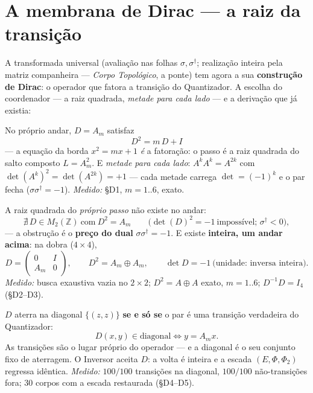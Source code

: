 \documentclass[livro.tex]{subfiles}
\begin{document}
\section{A membrana de Dirac --- a raiz da transição}\label{sec:dirac-operacoes}

A transformada universal (avaliação nas folhas $\sigma,\sigma^{\dagger}$;
realização inteira pela matriz companheira --- \emph{Corpo Topológico},
a ponte) tem agora a sua \textbf{construção de Dirac}: o operador que
fatora a transição do Quantizador. A escolha do coordenador --- a raiz
quadrada, \emph{metade para cada lado} --- e a derivação que já existia:

\begin{teorema}\label{thm:borda-dirac}
No próprio andar, $D=A_m$ satisfaz
\[
\boxed{D^{2}=m\,D+I}
\]
--- a equação da borda $x^{2}=mx+1$ \emph{é} a fatoração: o passo é a
raiz quadrada do salto composto $L=A_m^{2}$. E \emph{metade para cada
lado}: $A^{k}A^{k}=A^{2k}$ com $\det(A^{k})^{2}=\det(A^{2k})=+1$ ---
cada metade carrega $\det=(-1)^{k}$ e o par fecha
($\sigma\sigma^{\dagger}=-1$).
\emph{Medido:}  \S D1, $m=1..6$, exato.
\end{teorema}

\begin{teorema}\label{thm:furo}
A raiz quadrada do \emph{próprio passo} não existe no andar:
\[
\boxed{
\nexists\,D\in M_2(\mathbb{Z})\ \text{com}\ D^{2}=A_m
}
\qquad
\text{(}\det(D)^{2}=-1\ \text{impossível; }\sigma^{\dagger}<0\text{)},
\]
--- a obstrução é o \textbf{preço do dual} $\sigma\sigma^{\dagger}=-1$.
E existe \textbf{inteira, um andar acima}: na dobra ($4\times4$),
\[
\boxed{
D=\begin{pmatrix}0&I\\A_m&0\end{pmatrix},
\qquad
D^{2}=A_m\oplus A_m,
\qquad
\det D=-1\ \text{(unidade: inversa inteira).}
}
\]
\emph{Medido:} busca exaustiva vazia no $2\times2$; $D^{2}=A\oplus A$
exato, $m=1..6$; $D^{-1}D=I_4$ (\S D2--D3).
\end{teorema}

\begin{teorema}\label{thm:dirac-transicao}
$D$ aterra na diagonal $\{(z,z)\}$ \textbf{se e só se} o par é uma
transição verdadeira do Quantizador:
\[
\boxed{
D(x,y)\in\text{diagonal}
\iff
y=A_m x.
}
\]
As transições são o lugar próprio do operador --- e a diagonal é o seu
conjunto fixo de aterragem. O Inversor aceita $D$: a volta é inteira e
a escada $(E,\Phi,\Phi_2)$ regressa idêntica.
\emph{Medido:} $100/100$ transições na diagonal, $100/100$
não-transições fora; $30$ corpos com a escada restaurada (\S D4--D5).
\end{teorema}
\end{document}
